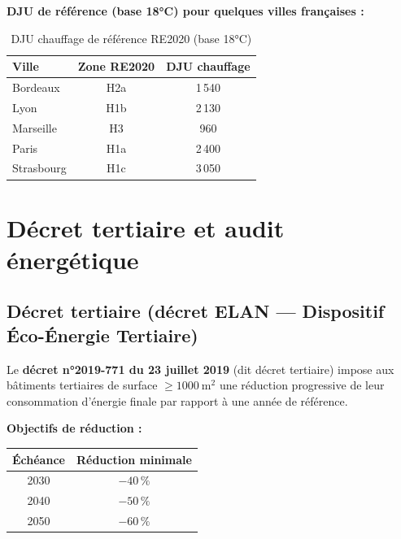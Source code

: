 \medskip
\noindent\textbf{DJU de référence (base 18°C) pour quelques villes françaises :}

\begin{table}[H]
  \centering
  \begin{tabular}{lcc}
    \toprule
    Ville & Zone RE2020 & DJU chauffage \\
    \midrule
    Bordeaux & H2a & 1\,540 \\
    Lyon & H1b & 2\,130 \\
    Marseille & H3 & 960 \\
    Paris & H1a & 2\,400 \\
    Strasbourg & H1c & 3\,050 \\
    \bottomrule
  \end{tabular}
  \caption{DJU chauffage de référence RE2020 (base 18°C)}
\end{table}

\section{Décret tertiaire et audit énergétique}

\subsection{Décret tertiaire (décret ELAN — Dispositif Éco-Énergie Tertiaire)}

\begin{definition}[title=Décret tertiaire]
Le \textbf{décret n°2019-771 du 23 juillet 2019} (dit décret tertiaire) impose aux bâtiments tertiaires de surface $\geq \SI{1000}{\metre\squared}$ une réduction progressive de leur consommation d'énergie finale par rapport à une année de référence.
\end{definition}

\textbf{Objectifs de réduction :}
\begin{center}
\begin{tabular}{cc}
  \toprule
  Échéance & Réduction minimale \\
  \midrule
  2030 & $-40\,\%$ \\
  2040 & $-50\,\%$ \\
  2050 & $-60\,\%$ \\
  \bottomrule
\end{tabular}
\end{center}


